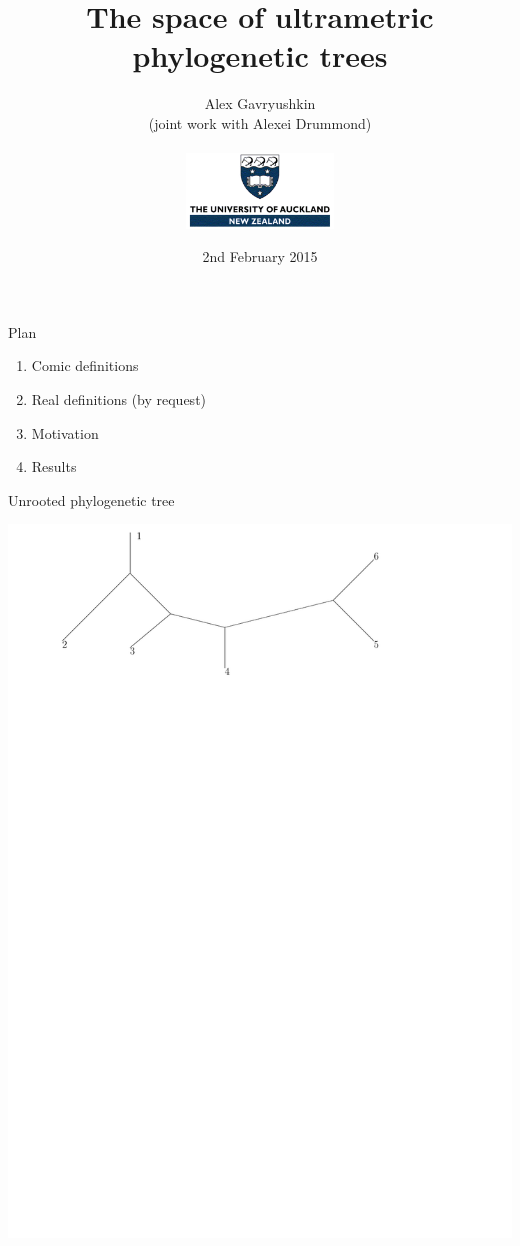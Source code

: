 \documentclass{beamer}
\title[Portobello `15: {\em The space of ultrametric phylogenetic trees}]{The space of ultrametric phylogenetic trees}
\author[Gavryushkin-Drummond ~~~~~~~~~~~~~ \href{mailto:a.gavruskin@auckland.ac.nz}{a.gavruskin@auckland.ac.nz}]{Alex Gavryushkin\\ (joint work with Alexei Drummond) \\ \ \\
\includegraphics[height=2cm]{UniAuckland}}
\date{2nd February 2015}
\begin{document}

\begin{frame}
\titlepage
\end{frame}

\begin{frame}{Plan}

\begin{enumerate}
\item Comic definitions 
\item Real definitions (by request)
\item Motivation 
\item Results 
\end{enumerate}
\end{frame}

\begin{frame}{Unrooted phylogenetic tree}

\begin{definition}
\includegraphics[width=\framewidth]{unrooted}
\end{definition}
\end{frame}
\end{document}
